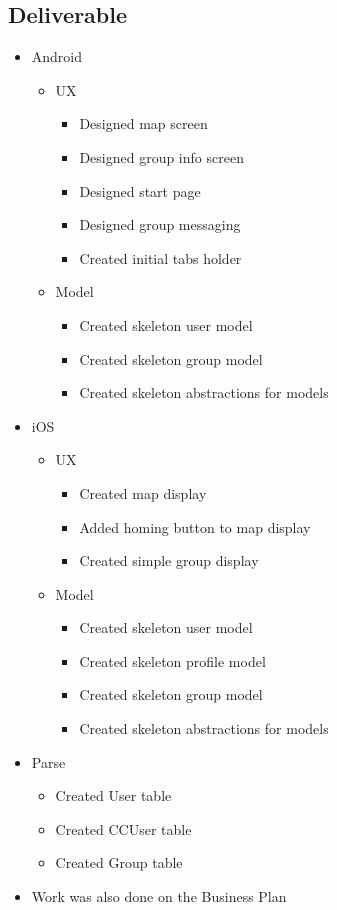 \subsection{Deliverable}
\begin{itemize}
	\item Android
	\begin{itemize}
		\item UX
		\begin{itemize}
			\item Designed map screen
			\item Designed group info screen
			\item Designed start page
			\item Designed group messaging
			\item Created initial tabs holder
		\end{itemize}
		\item Model
		\begin{itemize}
			\item Created skeleton user model
			\item Created skeleton group model
			\item Created skeleton abstractions for models
		\end{itemize}
	\end{itemize}
	\item iOS
	\begin{itemize}
		\item UX
		\begin{itemize}
			\item Created map display
			\item Added homing button to map display
			\item Created simple group display
		\end{itemize}
		\item Model
		\begin{itemize}
			\item Created skeleton user model
			\item Created skeleton profile model
			\item Created skeleton group model
			\item Created skeleton abstractions for models
		\end{itemize}
	\end{itemize}
	\item Parse
	\begin{itemize}
		\item Created User table
		\item Created CCUser table
		\item Created Group table
	\end{itemize}
	\item Work was also done on the Business Plan
\end{itemize}
